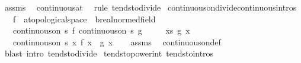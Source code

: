 \begin{isabellebody}
\isamarkupfalse%
\ assms\ \isamarkupfalse%
\ continuous{\isacharunderscore}{\kern0pt}at\ \isamarkupfalse%
\ {\isacharparenleft}{\kern0pt}rule\ tendsto{\isacharunderscore}{\kern0pt}divide{\isacharparenright}{\kern0pt}%
\endisatagproof
{\isafoldproof}%
%
\isadelimproof
\isanewline
%
\endisadelimproof
\isanewline
{}\isamarkupfalse%
\ continuous{\isacharunderscore}{\kern0pt}on{\isacharunderscore}{\kern0pt}divide{\isacharbrackleft}{\kern0pt}continuous{\isacharunderscore}{\kern0pt}intros{\isacharbrackright}{\kern0pt}{\isacharcolon}{\kern0pt}\isanewline
\ \ \ f\ {\isacharcolon}{\kern0pt}{\isacharcolon}{\kern0pt}\ {\isachardoublequoteopen}{\isacharprime}{\kern0pt}a{\isacharcolon}{\kern0pt}{\isacharcolon}{\kern0pt}topological{\isacharunderscore}{\kern0pt}space\ {\isasymRightarrow}\ {\isacharprime}{\kern0pt}b{\isacharcolon}{\kern0pt}{\isacharcolon}{\kern0pt}real{\isacharunderscore}{\kern0pt}normed{\isacharunderscore}{\kern0pt}field{\isachardoublequoteclose}\isanewline
\ \ \ {\isachardoublequoteopen}continuous{\isacharunderscore}{\kern0pt}on\ s\ f{\isachardoublequoteclose}\ {\isachardoublequoteopen}continuous{\isacharunderscore}{\kern0pt}on\ s\ g{\isachardoublequoteclose}\isanewline
\ \ \ \ \ {\isachardoublequoteopen}{\isasymforall}x{\isasymin}s{\isachardot}{\kern0pt}\ g\ x\ {\isasymnoteq}\ {}{\isachardoublequoteclose}\isanewline
\ \ \ {\isachardoublequoteopen}continuous{\isacharunderscore}{\kern0pt}on\ s\ {\isacharparenleft}{\kern0pt}{\isasymlambda}x{\isachardot}{\kern0pt}\ {\isacharparenleft}{\kern0pt}f\ x{\isacharparenright}{\kern0pt}\ {\isacharslash}{\kern0pt}\ {\isacharparenleft}{\kern0pt}g\ x{\isacharparenright}{\kern0pt}{\isacharparenright}{\kern0pt}{\isachardoublequoteclose}\isanewline
%
\isadelimproof
\ \ %
\endisadelimproof
%
\isatagproof
{}\isamarkupfalse%
\ assms\ \isamarkupfalse%
\ continuous{\isacharunderscore}{\kern0pt}on{\isacharunderscore}{\kern0pt}def\ \isamarkupfalse%
\ {\isacharparenleft}{\kern0pt}blast\ intro{\isacharcolon}{\kern0pt}\ tendsto{\isacharunderscore}{\kern0pt}divide{\isacharparenright}{\kern0pt}%
\endisatagproof
{\isafoldproof}%
%
\isadelimproof
\isanewline
%
\endisadelimproof
\isanewline
{}\isamarkupfalse%
\ tendsto{\isacharunderscore}{\kern0pt}power{\isacharunderscore}{\kern0pt}int\ {\isacharbrackleft}{\kern0pt}tendsto{\isacharunderscore}{\kern0pt}intros{\isacharbrackright}{\kern0pt}{\isacharcolon}{\kern0pt}\isanewline

\end{isabellebody}
